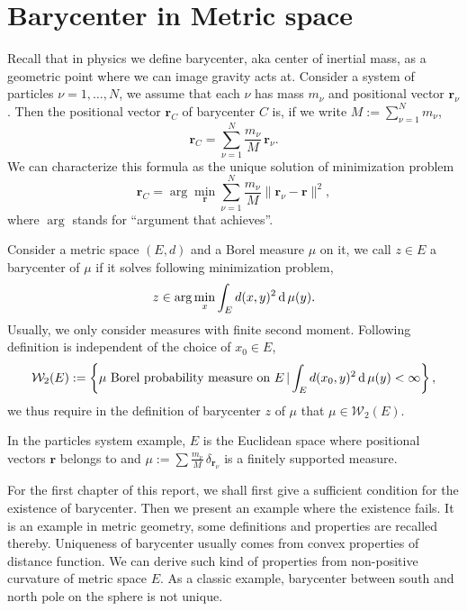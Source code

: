 \chapter{Barycenter in Metric space}
Recall that in physics we define barycenter, aka center of inertial mass,
as a geometric point where we can image gravity acts at.
Consider a system of particles  $\nu = 1, \ldots , N$,
we assume that each $\nu$ has mass $m_\nu$ and positional vector $\boldsymbol{r}_\nu$.
Then the positional vector $\boldsymbol{r}_C$ of barycenter $C$ is,
if we write \( M := \sum _ { \nu = 1 } ^ { N } m _ { \nu }\),
\[
	\boldsymbol { r }_ { C } =
	\sum_ { \nu = 1 } ^ { N } \frac{m_ { \nu } }{M}\,\boldsymbol { r }_ { \nu }.
\]
We can characterize this formula as the unique solution of minimization problem
\begin{equation}
	\label{barycenter_def}
	\boldsymbol{r}_C = \arg \min_{\boldsymbol{r}} \sum_{\nu= 1}^N \frac{m_\nu}{M}
	\|\boldsymbol{r}_{\nu} - \boldsymbol{r}\|^2,
\end{equation}
where $\arg$ stands for ``argument that achieves''.

\begin{defn}
	Consider a metric space $(E,d)$ and a Borel measure $\mu$ on it,
	we call $z \in E$ a barycenter of $\mu$ if it solves following minimization problem,
	\[
		z \in \arg\min_{x}\int_{E} d(x, y)^2 \operatorname{d} \mu (y).
	\]
	Usually, we only consider measures with finite second moment.
	Following definition is independent of the choice of $x_0 \in E$,
	\[
					\mathcal{W}_2(E): = \left\{ \mu \text{ Borel probability measure on } E \, |
		\int_{E} d(x_0, y)^2 \operatorname{d} \mu (y) < \infty\right\},
	\]
	we thus require in the definition of barycenter $z$ of $\mu$ that $\mu \in \mathcal{W}_2(E)$.
\end{defn}
\begin{rmk}
	In the particles system example, $E$ is the Euclidean space where positional vectors $\boldsymbol{r}$ belongs to
	and $\mu := \sum \frac{m_\nu}{M} \, \delta_{\boldsymbol{r}_\nu}$ is a finitely supported measure.
\end{rmk}

For the first chapter of this report, we shall first give a sufficient condition for the existence of barycenter.
Then we present an example where the existence fails.
It is an example in metric geometry,
some definitions and properties are recalled thereby.
Uniqueness of barycenter usually comes from convex properties of distance function.
We can derive such kind of properties from non-positive curvature of metric space $E$.
As a classic example, barycenter between south and north pole on the sphere is not unique.

